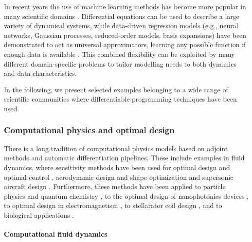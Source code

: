 In recent years the use of machine learning methods has become more popular in many scientific domains \cite{ml_clouds_climate, chem_ml_review, bio_ml_review}. 
Differential equations can be used to describe a large variety of dynamical systems, while data-driven regression models (e.g., neural networks, Gaussian processes, reduced-order models, basis expansions) have been demonstrated to act as universal approximators, learning any possible function if enough data is available \cite{gorban_1998}. 
This combined flexibility can be exploited by many different domain-specific problems to tailor modelling needs to both dynamics and data characteristics.

In the following, we present selected examples belonging to a wide range of scientific communities where differentiable programming techniques have been used. 

\subsubsection{Computational physics and optimal design}

There is a long tradition of computational physics models based on adjoint methods and automatic differentiation pipelines. 
These include examples in fluid dynamics, where sensitivity methods have been used for optimal design and optimal control
\cite{lions1971optimal, pironneau2005optimal}, aerodynamic design and shape optimization
\cite{Jameson_1988,Giles_Pierce_2000, mohammadi2009applied,allaire2014shape} and 
supersonic aircraft design \cite{hu2010supersonic, fike2013multi}.
Furthermore, these methods have been applied to particle physics \cite{Dorigo.2022} and quantum chemistry \cite{Arrazola.2021}, to the optimal design of nanophotonics devices  \cite{Molesky_Lin_Piggott_Jin_Vucković_Rodriguez_2018}, to optimal design in electromagnetism \cite{Georgieva_Glavic_Bakr_Bandler_2002}, to stellarator coil design \cite{McGreivy_stellarator_2021}, and to biological applications \cite{Strouwen2022}.

\paragraph{Computational fluid dynamics}



